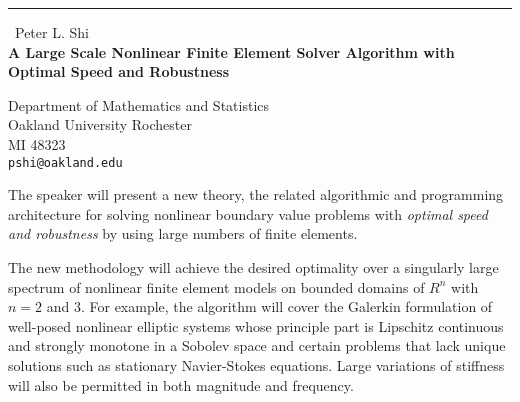 \documentclass{report}
\begin{document}
\begin{center}
\rule{6in}{1pt} \
{\large Peter L. Shi \\
{\bf A Large Scale Nonlinear Finite Element Solver Algorithm with Optimal Speed and Robustness}}

Department of Mathematics and Statistics \\ Oakland University Rochester \\ MI 48323
\\
{\tt pshi@oakland.edu}\end{center}

The speaker will present a new theory, the related algorithmic and
programming architecture for solving nonlinear boundary value problems
with {\it optimal speed and robustness} by using large numbers of finite
elements.


The new methodology will achieve the desired optimality
over a singularly large spectrum of nonlinear finite element models on
bounded domains of $R^n$ with $n=2$ and 3.
For example, the algorithm will cover the Galerkin formulation
of well-posed nonlinear elliptic systems whose principle part is
Lipschitz continuous and strongly monotone in a Sobolev space and certain
problems that lack unique solutions such as stationary Navier-Stokes
equations. Large variations of stiffness will also be permitted in both
magnitude and frequency.
\end{document}
